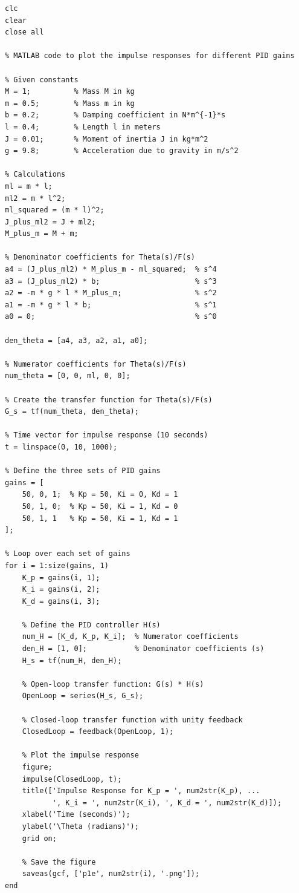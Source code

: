 \documentclass{article}
\begin{document}
\begin{lstlisting}
clc
clear
close all

% MATLAB code to plot the impulse responses for different PID gains

% Given constants
M = 1;          % Mass M in kg
m = 0.5;        % Mass m in kg
b = 0.2;        % Damping coefficient in N*m^{-1}*s
l = 0.4;        % Length l in meters
J = 0.01;       % Moment of inertia J in kg*m^2
g = 9.8;        % Acceleration due to gravity in m/s^2

% Calculations
ml = m * l;
ml2 = m * l^2;
ml_squared = (m * l)^2;
J_plus_ml2 = J + ml2;
M_plus_m = M + m;

% Denominator coefficients for Theta(s)/F(s)
a4 = (J_plus_ml2) * M_plus_m - ml_squared;  % s^4
a3 = (J_plus_ml2) * b;                      % s^3
a2 = -m * g * l * M_plus_m;                 % s^2
a1 = -m * g * l * b;                        % s^1
a0 = 0;                                     % s^0

den_theta = [a4, a3, a2, a1, a0];

% Numerator coefficients for Theta(s)/F(s)
num_theta = [0, 0, ml, 0, 0];

% Create the transfer function for Theta(s)/F(s)
G_s = tf(num_theta, den_theta);

% Time vector for impulse response (10 seconds)
t = linspace(0, 10, 1000);

% Define the three sets of PID gains
gains = [
    50, 0, 1;  % Kp = 50, Ki = 0, Kd = 1
    50, 1, 0;  % Kp = 50, Ki = 1, Kd = 0
    50, 1, 1   % Kp = 50, Ki = 1, Kd = 1
];

% Loop over each set of gains
for i = 1:size(gains, 1)
    K_p = gains(i, 1);
    K_i = gains(i, 2);
    K_d = gains(i, 3);
    
    % Define the PID controller H(s)
    num_H = [K_d, K_p, K_i];  % Numerator coefficients
    den_H = [1, 0];           % Denominator coefficients (s)
    H_s = tf(num_H, den_H);
    
    % Open-loop transfer function: G(s) * H(s)
    OpenLoop = series(H_s, G_s);
    
    % Closed-loop transfer function with unity feedback
    ClosedLoop = feedback(OpenLoop, 1);
    
    % Plot the impulse response
    figure;
    impulse(ClosedLoop, t);
    title(['Impulse Response for K_p = ', num2str(K_p), ...
           ', K_i = ', num2str(K_i), ', K_d = ', num2str(K_d)]);
    xlabel('Time (seconds)');
    ylabel('\Theta (radians)');
    grid on;
    
    % Save the figure
    saveas(gcf, ['p1e', num2str(i), '.png']);
end
\end{lstlisting}
\end{document}
